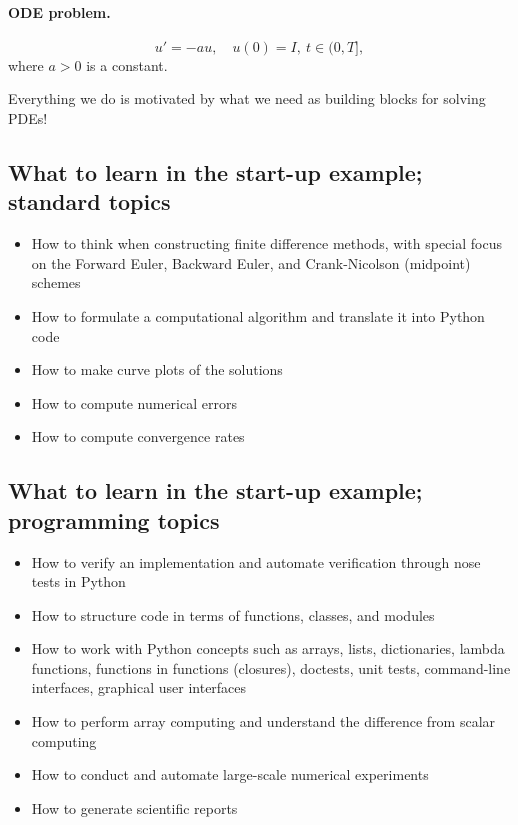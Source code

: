 \documentclass[%
oneside,                 %
final,                   %
10pt]{article}
\begin{document}
\paragraph{ODE problem.}
\[ u'=-au,\quad u(0)=I,\ t\in (0,T],\]
where $a>0$ is a constant.



Everything we do is motivated by what we need as building blocks for
solving PDEs!

\subsection*{What to learn in the start-up example; standard topics}

\begin{itemize}
 \item How to think when constructing finite difference methods, with special focus
   on the Forward Euler, Backward Euler, and Crank-Nicolson (midpoint)
   schemes

 \item How to formulate a computational algorithm and translate it into
   Python code

 \item How to make curve plots of the solutions

 \item How to compute numerical errors

 \item How to compute convergence rates
\end{itemize}

\noindent
\subsection*{What to learn in the start-up example; programming topics}

\begin{itemize}
 \item How to verify an implementation and automate verification
   through nose tests in Python

 \item How to structure code in terms of functions, classes, and modules

 \item How to work with Python concepts such as arrays, lists, dictionaries,
   lambda functions, functions in functions (closures), doctests,
   unit tests, command-line interfaces, graphical user interfaces

 \item How to perform array computing and understand the difference from
   scalar computing

 \item How to conduct and automate large-scale numerical experiments

 \item How to generate scientific reports
\end{itemize}
\end{document}
